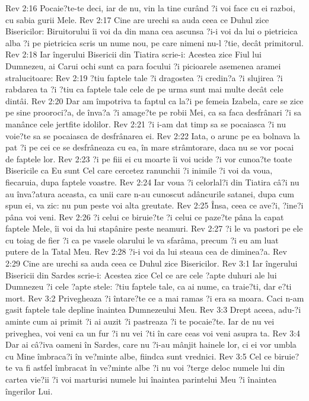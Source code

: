 Rev 2:16  Pocaie?te-te deci, iar de nu, vin la tine curând ?i voi face cu ei razboi, cu sabia gurii Mele.
Rev 2:17  Cine are urechi sa auda ceea ce Duhul zice Bisericilor: Biruitorului îi voi da din mana cea ascunsa ?i-i voi da lui o pietricica alba ?i pe pietricica scris un nume nou, pe care nimeni nu-l ?tie, decât primitorul.
Rev 2:18  Iar îngerului Bisericii din Tiatira scrie-i: Acestea zice Fiul lui Dumnezeu, ai Carui ochi sunt ca para focului ?i picioarele asemenea aramei stralucitoare:
Rev 2:19  ?tiu faptele tale ?i dragostea ?i credin?a ?i slujirea ?i rabdarea ta ?i ?tiu ca faptele tale cele de pe urma sunt mai multe decât cele dintâi.
Rev 2:20  Dar am împotriva ta faptul ca la?i pe femeia Izabela, care se zice pe sine prooroci?a, de înva?a ?i amage?te pe robii Mei, ca sa faca desfrânari ?i sa manânce cele jertfite idolilor.
Rev 2:21  ?i i-am dat timp sa se pocaiasca ?i nu voie?te sa se pocaiasca de desfrânarea ei.
Rev 2:22  Iata, o arunc pe ea bolnava la pat ?i pe cei ce se desfrâneaza cu ea, în mare strâmtorare, daca nu se vor pocai de faptele lor.
Rev 2:23  ?i pe fiii ei cu moarte îi voi ucide ?i vor cunoa?te toate Bisericile ca Eu sunt Cel care cercetez ranunchii ?i inimile ?i voi da voua, fiecaruia, dupa faptele voastre.
Rev 2:24  Iar voua ?i celorlal?i din Tiatira câ?i nu au înva?atura aceasta, ca unii care n-au cunoscut adâncurile satanei, dupa cum spun ei, va zic: nu pun peste voi alta greutate.
Rev 2:25  Însa, ceea ce ave?i, ?ine?i pâna voi veni.
Rev 2:26  ?i celui ce biruie?te ?i celui ce paze?te pâna la capat faptele Mele, îi voi da lui stapânire peste neamuri.
Rev 2:27  ?i le va pastori pe ele cu toiag de fier ?i ca pe vasele olarului le va sfarâma, precum ?i eu am luat putere de la Tatal Meu.
Rev 2:28  ?i-i voi da lui steaua cea de diminea?a.
Rev 2:29  Cine are urechi sa auda ceea ce Duhul zice Bisericilor.
Rev 3:1  Iar îngerului Bisericii din Sardes scrie-i: Acestea zice Cel ce are cele ?apte duhuri ale lui Dumnezeu ?i cele ?apte stele: ?tiu faptele tale, ca ai nume, ca traie?ti, dar e?ti mort.
Rev 3:2  Privegheaza ?i întare?te ce a mai ramas ?i era sa moara. Caci n-am gasit faptele tale depline înaintea Dumnezeului Meu.
Rev 3:3  Drept aceea, adu-?i aminte cum ai primit ?i ai auzit ?i pastreaza ?i te pocaie?te. Iar de nu vei priveghea, voi veni ca un fur ?i nu vei ?ti în care ceas voi veni asupra ta.
Rev 3:4  Dar ai câ?iva oameni în Sardes, care nu ?i-au mânjit hainele lor, ci ei vor umbla cu Mine îmbraca?i în ve?minte albe, fiindca sunt vrednici.
Rev 3:5  Cel ce biruie?te va fi astfel îmbracat în ve?minte albe ?i nu voi ?terge deloc numele lui din cartea vie?ii ?i voi marturisi numele lui înaintea parintelui Meu ?i înaintea îngerilor Lui.
